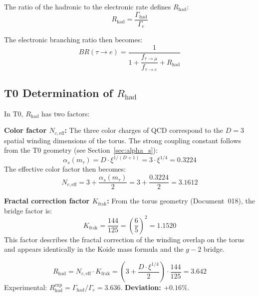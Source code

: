 	The ratio of the hadronic to the electronic rate defines $R_\text{had}$:
	\begin{equation}
		R_\text{had} = \frac{\Gamma_\text{had}}{\Gamma_e}
	\end{equation}
	
	The electronic branching ratio then becomes:
	\begin{equation}
		BR(\tau \to e) = \frac{1}{1 + \dfrac{f_{\tau \to \mu}}{f_{\tau \to e}} + R_\text{had}}
		\label{eq:br}
	\end{equation}
	
	\subsection{T0 Determination of $R_\text{had}$}
	
	In T0, $R_\text{had}$ has two factors:
	
	\textbf{Color factor $N_{c,\text{eff}}$:} The three color charges of QCD correspond to the $D = 3$ spatial winding dimensions of the torus. The strong coupling constant follows from the T0 geometry (see Section~\ref{sec:alpha_s}):
	\begin{equation}
		\alpha_s(m_\tau) = D \cdot \xi^{1/(D+1)} = 3 \cdot \xi^{1/4} = 0.3224
	\end{equation}
	The effective color factor then becomes:
	\begin{equation}
		N_{c,\text{eff}} = 3 + \frac{\alpha_s(m_\tau)}{2} = 3 + \frac{0.3224}{2} = 3.1612
	\end{equation}
	
	\textbf{Fractal correction factor $K_\text{frak}$:} From the torus geometry (Document~018), the bridge factor is:
	\begin{equation}
		K_\text{frak} = \frac{144}{125} = \left(\frac{6}{5}\right)^2 = 1.1520
	\end{equation}
	This factor describes the fractal correction of the winding overlap on the torus and appears identically in the Koide mass formula and the $g-2$ bridge.
	
	\begin{keypoint}
		\begin{equation}
			R_\text{had} = N_{c,\text{eff}} \cdot K_\text{frak} = \left(3 + \frac{D \cdot \xi^{1/4}}{2}\right) \cdot \frac{144}{125} = 3.642
			\label{eq:rhad}
		\end{equation}
		Experimental: $R_\text{had}^\text{exp} = \Gamma_\text{had}/\Gamma_e = 3.636$. \textbf{Deviation: $+0.16\%$}.
	\end{keypoint}
	

